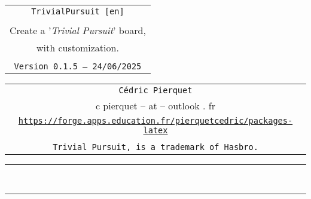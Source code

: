 \documentclass[11pt,a4paper]{ltxdoc}
\def\TPversion{0.1.5}
\def\TPdate{24/06/2025}
\begin{document}
\pagestyle{fancy}

\thispagestyle{empty}

\begin{center}
	\begin{minipage}{0.88\linewidth}
	\begin{tcolorbox}[colframe=yellow,colback=yellow!15]
		\begin{center}
			\begin{tabular}{c}
				{\Huge \texttt{TrivialPursuit [en]}}\\
				\\
				{\LARGE Create a '\textit{Trivial Pursuit}' board,} \\
				{\LARGE with customization.} \\
				\\
				{\small \texttt{Version \TPversion{} -- \TPdate}}
		\end{tabular}
		\end{center}
	\end{tcolorbox}
\end{minipage}
\end{center}

\begin{center}
	\begin{tabular}{c}
	\texttt{Cédric Pierquet}\\
	{\ttfamily c pierquet -- at -- outlook . fr}\\
	\texttt{\url{https://forge.apps.education.fr/pierquetcedric/packages-latex}} \\
	\\
	\texttt{Trivial Pursuit\texttrademark, is a trademark of Hasbro.}
\end{tabular}
\end{center}

\hrule

\vfill

\begin{tcolorbox}[colframe=lightgray,colback=lightgray!5]
\BoardTrivialPursuit
\end{tcolorbox}

\vfill~

\pagebreak


\hypertarget{matoc}{}

\tableofcontents

\vspace*{5mm}

\hrule

\vspace*{5mm}
\end{document}
